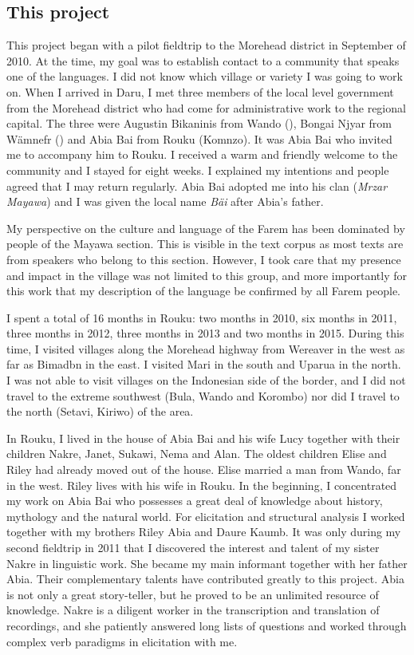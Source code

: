 \subsection{This project}\label{thisproject}

This project began with a pilot fieldtrip to the Morehead district in September of 2010. At the time, my goal was to establish contact to a community that speaks one of the  languages. I did not know which village or variety I was going to work on. When I arrived in Daru, I met three members of the local level government from the Morehead district who had come for administrative work to the regional capital. The three were Augustin Bikaninis from Wando (), Bongai Njyar from Wämnefr () and Abia Bai from Rouku (Komnzo). It was Abia Bai who invited me to accompany him to Rouku. I received a warm and friendly welcome to the community and I stayed for eight weeks. I explained my intentions and people agreed that I may return regularly. Abia Bai adopted me into his clan (\emph{Mrzar Mayawa}) and I was given the local name \emph{Bäi} after Abia's father.

My perspective on the culture and language of the Farem has been dominated by people of the Mayawa section. This is visible in the text corpus as most texts are from speakers who belong to this section. However, I took care that my presence and impact in the village was not limited to this group, and {\textendash} more importantly for this work {\textendash} that my description of the language be confirmed by all Farem people.

I spent a total of 16 months in Rouku: two months in 2010, six months in 2011, three months in 2012, three months in 2013 and two months in 2015. During this time, I visited villages along the Morehead highway from Wereaver in the west as far as Bimadbn in the east. I visited Mari in the south and Uparua in the north. I was not able to visit villages on the Indonesian side of the border, and I did not travel to the extreme southwest (Bula, Wando and Korombo) nor did I travel to the north (Setavi, Kiriwo) of the area.

In Rouku, I lived in the house of Abia Bai and his wife Lucy together with their children Nakre, Janet, Sukawi, Nema and Alan. The oldest children Elise and Riley had already moved out of the house. Elise married a man from Wando, far in the west. Riley lives with his wife in Rouku. In the beginning, I concentrated my work on Abia Bai who possesses a great deal of knowledge about history, mythology and the natural world. For elicitation and structural analysis I worked together with my brothers Riley Abia and Daure Kaumb. It was only during my second fieldtrip in 2011 that I discovered the interest and talent of my sister Nakre in linguistic work. She became my main informant together with her father Abia. Their complementary talents have contributed greatly to this project. Abia is not only a great story-teller, but he proved to be an unlimited resource of knowledge. Nakre is a diligent worker in the transcription and translation of recordings, and she patiently answered long lists of questions and worked through complex verb paradigms in elicitation with me.

